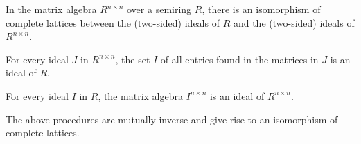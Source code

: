 \begin{proposition}\label{thm:matrix_algebra_ideals}
  In the \hyperref[thm:matrix_algebra]{matrix algebra} \( R^{n \times n} \) over a \hyperref[def:semiring]{semiring} \( R \), there is an \hyperref[def:lattice/morphism]{isomorphism of complete lattices} between the (two-sided) ideals of \( R \) and the (two-sided) ideals of \( R^{n \times n} \).

  \begin{thmenum}
     For every ideal \( J \) in \( R^{n \times n} \), the set \( I \) of all entries found in the matrices in \( J \) is an ideal of \( R \).

     For every ideal \( I \) in \( R \), the matrix algebra \( I^{n \times n} \) is an ideal of \( R^{n \times n} \).

     The above procedures are mutually inverse and give rise to an isomorphism of complete lattices.
  \end{thmenum}
\end{proposition}
